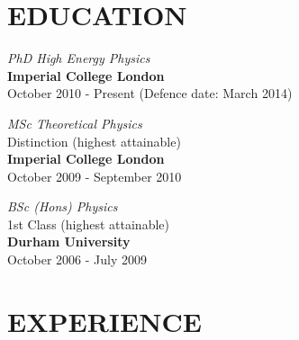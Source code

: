 \documentclass[margin, 10pt]{res} %
\begin{document}
\begin{resume}


\section{EDUCATION}

{\sl PhD High Energy Physics} \\
{\bf Imperial College London} \\
October 2010 - Present (Defence date: March 2014)

{\sl MSc Theoretical Physics} \\ %
Distinction (highest attainable) \\ %
{\bf Imperial College London} \\
October 2009 - September 2010 

{\sl BSc (Hons) Physics} \\ %
1st Class (highest attainable) \\ %
{\bf Durham University} \\
October 2006 - July 2009 
 
 
\section{EXPERIENCE}


\end{resume}
\end{document}

